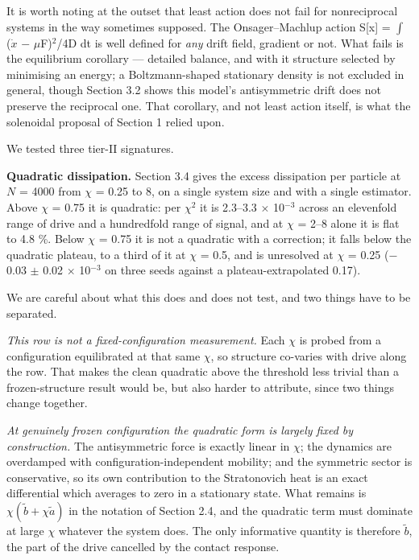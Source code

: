 \documentclass[aps,pre,preprint,superscriptaddress,nofootinbib,longbibliography]{revtex4-2}
\begin{document}
It is worth noting at the outset that least action does not fail for nonreciprocal systems in the way sometimes supposed. The Onsager--Machlup action S[x] = $\int$ ($\dot{x}$ $-$ $\mu$F)$^{2}$/4D dt is well defined for \emph{any} drift field, gradient or not. What fails is the equilibrium corollary --- detailed balance, and with it structure selected by minimising an energy; a Boltzmann-shaped stationary density is not excluded in general, though Section 3.2 shows this model's antisymmetric drift does not preserve the reciprocal one. That corollary, and not least action itself, is what the solenoidal proposal of Section 1 relied upon.

We tested three tier-II signatures.

\textbf{Quadratic dissipation.} Section 3.4 gives the excess dissipation per particle at $N$ = 4000 from $\chi$ = 0.25 to 8, on a single system size and with a single estimator. Above $\chi$ = 0.75 it is quadratic: per $\chi ^{2}$ it is 2.3--3.3 $\times$ 10$^{-3}$ across an elevenfold range of drive and a hundredfold range of signal, and at $\chi$ = 2--8 alone it is flat to 4.8 \%. Below $\chi$ = 0.75 it is not a quadratic with a correction; it falls below the quadratic plateau, to a third of it at $\chi$ = 0.5, and is unresolved at $\chi$ = 0.25 ($-$0.03 $\pm$ 0.02 $\times$ 10$^{-3}$ on three seeds against a plateau-extrapolated 0.17).

We are careful about what this does and does not test, and two things have to be separated.

\emph{This row is not a fixed-configuration measurement.} Each $\chi$ is probed from a configuration equilibrated at that same $\chi$, so structure co-varies with drive along the row. That makes the clean quadratic above the threshold less trivial than a frozen-structure result would be, but also harder to attribute, since two things change together.

\emph{At genuinely frozen configuration the quadratic form is largely fixed by construction.} The antisymmetric force is exactly linear in $\chi$; the dynamics are overdamped with configuration-independent mobility; and the symmetric sector is conservative, so its own contribution to the Stratonovich heat is an exact differential which averages to zero in a stationary state. What remains is $\chi(\tilde b+\chi\tilde a)$ in the notation of Section 2.4, and the quadratic term must dominate at large $\chi$ whatever the system does. The only informative quantity is therefore $\tilde b$, the part of the drive cancelled by the contact response.
\end{document}
